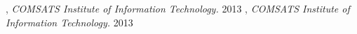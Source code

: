 
, \textit{COMSATS Institute of Information Technology.}	\hfill 2013
, \textit{COMSATS Institute of Information Technology.}	\hfill 2013


